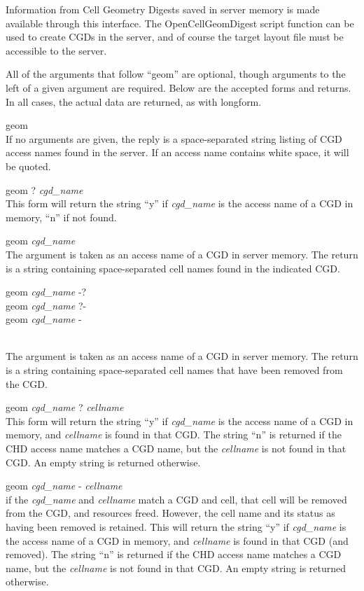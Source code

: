 \begin{description}
Information from Cell Geometry Digests saved in server memory is made
available through this interface.  The {\vt OpenCellGeomDigest} script
function can be used to create CGDs in the server, and of course the
target layout file must be accessible to the server.

All of the arguments that follow ``{\vt geom}'' are optional, though
arguments to the left of a given argument are required.  Below are the
accepted forms and returns.  In all cases, the actual data are
returned, as with {\vt longform}.

\begin{description}
\item{\vt geom}\\
If no arguments are given, the reply is a space-separated string
listing of CGD access names found in the server.  If an access
name contains white space, it will be quoted.

\item{\vt geom ?} {\it cgd\_name}\\
This form will return the string ``{\vt y}'' if {\it cgd\_name} is the
access name of a CGD in memory, ``{\vt n}'' if not found.

\item{\vt geom} {\it cgd\_name}\\
The argument is taken as an access name of a CGD in server memory. 
The return is a string containing space-separated cell names found in
the indicated CGD.

\item\parbox[b]{4in}{{\vt geom} {\it cgd\_name} {\vt -?}\\
  {\vt geom} {\it cgd\_name} {\vt ?-}\\
  {\vt geom} {\it cgd\_name} {\vt -}}\\
The argument is taken as an access name of a CGD in server memory.
The return is a string containing space-separated cell names that
have been removed from the CGD.

\item{\vt geom} {\it cgd\_name} {\vt ?} {\it cellname}\\
This form will return the string ``{\vt y}'' if {\it cgd\_name} is the
access name of a CGD in memory, and {\it cellname} is found in that
CGD.  The string ``{\vt n}'' is returned if the CHD access name
matches a CGD name, but the {\it cellname} is not found in that CGD. 
An empty string is returned otherwise.

\item{\vt geom} {\it cgd\_name} {\vt -} {\it cellname}\\
if the {\it cgd\_name} and {\it cellname} match a CGD and cell, that
cell will be removed from the CGD, and resources freed.  However, the
cell name and its status as having been removed is retained.  This
will return the string ``{\vt y}'' if {\it cgd\_name} is the access
name of a CGD in memory, and {\it cellname} is found in that CGD (and
removed).  The string ``{\vt n}'' is returned if the CHD access name
matches a CGD name, but the {\it cellname} is not found in that CGD. 
An empty string is returned otherwise.


\end{description}
\end{description}
